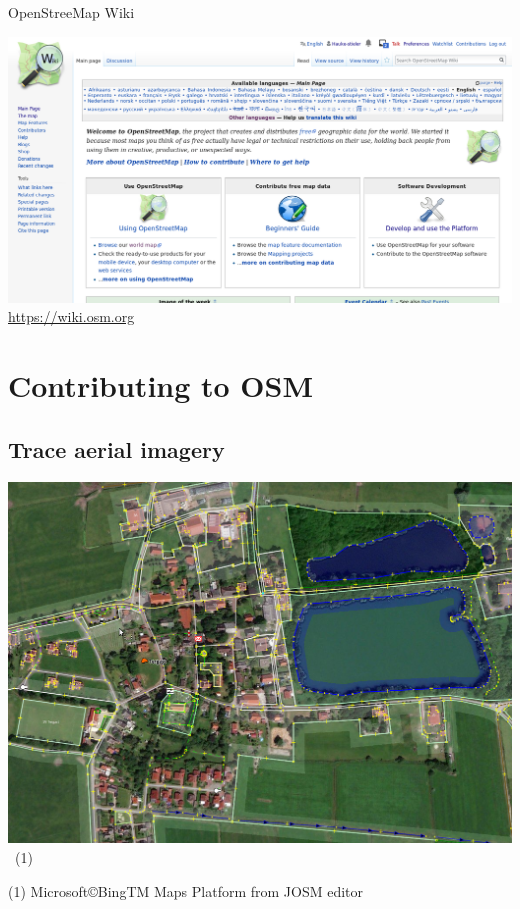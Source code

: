 \documentclass{beamer}
\begin{document}
	\begin{frame}{OpenStreeMap Wiki}
		\begin{center}
			\includegraphics[height=0.7\textheight]{images/osm-wiki}\\
			\url{https://wiki.osm.org}
		\end{center}
	\end{frame}

	\section{Contributing to OSM}
	
	\subsection{Trace aerial imagery}
	
	\begin{frame}
		\begin{center}
			\includegraphics[width=0.8\linewidth,height=0.8\textheight,keepaspectratio]{images/trace_imagery.png}~\tiny{(1)}
		\end{center}
		{\tiny (1) Microsoft\copyright BingTM Maps Platform from JOSM editor}
	\end{frame}
	
\end{document}
